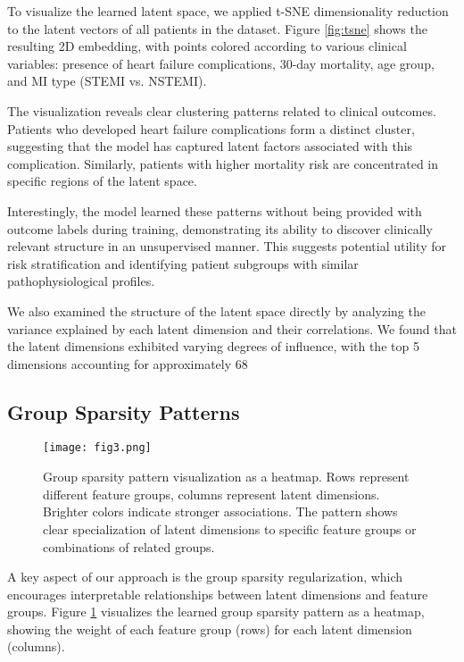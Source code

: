 \documentclass[oupdraft]{bio}
\begin{document}
To visualize the learned latent space, we applied t-SNE dimensionality reduction to the latent vectors of all patients in the dataset. Figure \ref{fig:tsne} shows the resulting 2D embedding, with points colored according to various clinical variables: presence of heart failure complications, 30-day mortality, age group, and MI type (STEMI vs. NSTEMI).

The visualization reveals clear clustering patterns related to clinical outcomes. Patients who developed heart failure complications form a distinct cluster, suggesting that the model has captured latent factors associated with this complication. Similarly, patients with higher mortality risk are concentrated in specific regions of the latent space.

Interestingly, the model learned these patterns without being provided with outcome labels during training, demonstrating its ability to discover clinically relevant structure in an unsupervised manner. This suggests potential utility for risk stratification and identifying patient subgroups with similar pathophysiological profiles.

We also examined the structure of the latent space directly by analyzing the variance explained by each latent dimension and their correlations. We found that the latent dimensions exhibited varying degrees of influence, with the top 5 dimensions accounting for approximately 68%

\subsection{Group Sparsity Patterns}

\begin{figure}[t]
    \centering
    \texttt{[image: fig3.png]}
    \caption{Group sparsity pattern visualization as a heatmap. Rows represent different feature groups, columns represent latent dimensions. Brighter colors indicate stronger associations. The pattern shows clear specialization of latent dimensions to specific feature groups or combinations of related groups.}
    \label{fig:sparsity}
\end{figure}

A key aspect of our approach is the group sparsity regularization, which encourages interpretable relationships between latent dimensions and feature groups. Figure \ref{fig:sparsity} visualizes the learned group sparsity pattern as a heatmap, showing the weight of each feature group (rows) for each latent dimension (columns).
\end{document}
